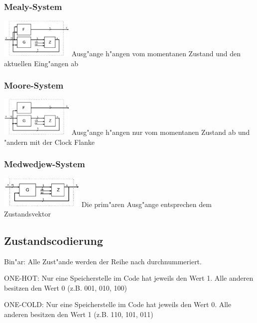 	\begin{multicols}{3}
		\subsubsection{Mealy-System}
			\includegraphics[width=0.26\textwidth]{pics/seq_mealy}
			Ausg"ange h"angen vom momentanen Zustand und den aktuellen Eing"angen ab
			
		\subsubsection{Moore-System}
			\includegraphics[width=0.26\textwidth]{pics/seq_moore}
			Ausg"ange h"angen nur vom momentanen Zustand ab und "andern mit der Clock Flanke
			
		\subsubsection{Medwedjew-System}
			\includegraphics[width=0.3\textwidth]{pics/seq_medmedjew}
			Die prim"aren Ausg"ange entsprechen dem Zustandsvektor
	\end{multicols}
	
\subsection{Zustandscodierung}
	\begin{multicols}{3}
		\begin{compactitem}
			\item Bin"ar: Alle Zust"ande werden der Reihe nach durchnummeriert.
			\newline
			\newline
			\item ONE-HOT: Nur eine Speicherstelle im Code hat jeweils den Wert 1. Alle anderen besitzen den Wert 0 (z.B. 001, 010, 100)
			\item ONE-COLD: Nur eine Speicherstelle im Code hat jeweils den Wert 0. Alle anderen besitzen den Wert 1 (z.B. 110, 101, 011)
		\end{compactitem}
	\end{multicols}
	
